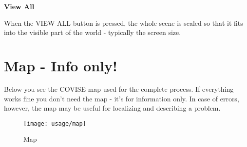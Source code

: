{\bf View All}

When the VIEW ALL button is pressed, the whole scene is scaled so that it fits into 
the visible part of the world - typically the screen size. 
\clearpage

\section{Map - Info only!}

Below you see the COVISE map used for the complete process. If everything works fine
you don't need the map - it's for information only. In case of errors, however, the
map may be useful for localizing and describing a problem.


\begin{figure}[!Hhtp]
  \begin{center}
   \texttt{[image: usage/map]}
   \caption{Map}
  \end{center}
\end{figure}
\clearpage
